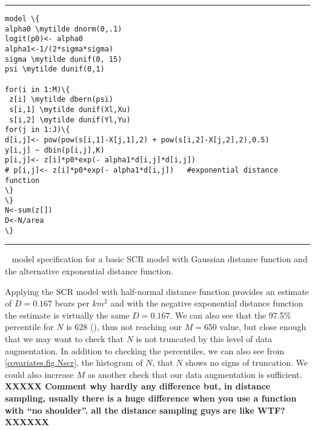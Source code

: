 \begin{panel}[htp]
\centering
\rule[0.1in]{\textwidth}{.03in}
{\small
\begin{Verbatim}[commandchars=\\\{\}]
model \{
alpha0 \mytilde dnorm(0,.1)
logit(p0)<- alpha0
alpha1<-1/(2*sigma*sigma)
sigma \mytilde dunif(0, 15)
psi \mytilde dunif(0,1)

for(i in 1:M)\{
 z[i] \mytilde dbern(psi)
 s[i,1] \mytilde dunif(Xl,Xu)
 s[i,2] \mytilde dunif(Yl,Yu)
for(j in 1:J)\{
d[i,j]<- pow(pow(s[i,1]-X[j,1],2) + pow(s[i,2]-X[j,2],2),0.5)
y[i,j] ~ dbin(p[i,j],K)
p[i,j]<- z[i]*p0*exp(- alpha1*d[i,j]*d[i,j])
# p[i,j]<- z[i]*p0*exp(- alpha1*d[i,j])   #exponential distance function
\}
\}
N<-sum(z[])
D<-N/area
\}

\end{Verbatim}
}

\rule[-0.1in]{\textwidth}{.03in}
\caption{
\jags~ model specification for a basic SCR model with Gaussian
distance 
function and the alternative exponential distance function.}
\label{covariates.panel.basicSCR}
\end{panel}

Applying the SCR model with  half-normal
distance function provides an estimate of $D = 0.167$ bears per $km^2$ and with the
negative exponential distance function the estimate is virtually the 
same $D = 0.167$.   We can also see that the 97.5\%
percentile for $N$ is 628 (\label{covariates.tab.SCR0exp}), thus not reaching our $M=650$ value, but
close enough that we may want to check that $N$ is not truncated by
this level of data augmentation.  In addition to checking the percentiles, 
we can also see from \ref{covariates.fig.Nscr}, the histogram of $N$, that $N$ 
shows no signs of truncation.  We could also increase
$M$ as another check that our data augmentation is sufficient.  {\bf
  XXXXX Comment why hardly any difference but, in distance sampling,
  usually there is a huge difference when you use a function with ``no
  shoulder''. all the distance sampling guys are like WTF? XXXXXX}

